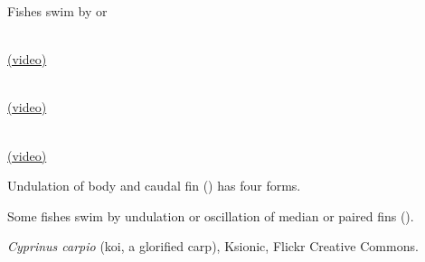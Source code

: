 \documentclass[t]{beamer}
\begin{document}
{
\begin{frame}[b,plain]{Fishes swim by  or }

\hspace{3em}%
	\parbox{\widthof{Anguilliform}}{\centering{}\\ %
		{\small \href{http://www.youtube.com/watch?v=LDrvbr_CbhE}{(video)}}}\hfill%
	\parbox{\widthof{Carangiform}}{\centering{}\\ %
		{\small \href{http://www.youtube.com/watch?v=OYrdFlr2vU8}{(video)}}}\hfill%
	\parbox{\widthof{Ostraciform}}{\centering{}\\ %
		{\small \href{http://www.youtube.com/watch?v=tsJzGycQMcE}{(video)}}}%
\hspace{3em}

\vspace{1\baselineskip}

\end{frame}
}

{
\begin{frame}[b,plain]{Undulation of body and caudal fin () has four forms.}

\end{frame}
}

{
\begin{frame}[b,plain]

\end{frame}
}

{
\begin{frame}[b,plain]{Some fishes swim by undulation or oscillation of median or paired fins ().}

\end{frame}
}

{
\begin{frame}[b,plain]

\end{frame}
}



{
\begin{frame}[b,plain]
\hfill\tiny\textcolor{white!40!orange}{\textit{Cyprinus carpio} (koi, a glorified carp), Ksionic, Flickr Creative Commons.}
\end{frame}
}
\end{document}

